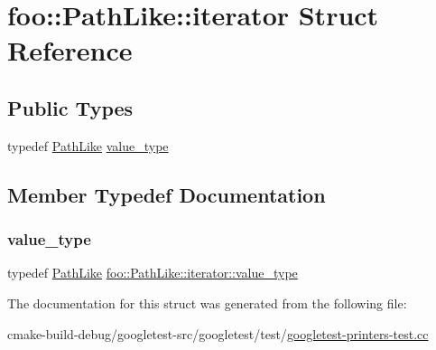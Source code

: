 \hypertarget{structfoo_1_1PathLike_1_1iterator}{}\section{foo\+::Path\+Like\+::iterator Struct Reference}
\label{structfoo_1_1PathLike_1_1iterator}
\subsection*{Public Types}
\begin{DoxyCompactItemize}
\item 
typedef \mbox{\hyperlink{classfoo_1_1PathLike}{Path\+Like}} \mbox{\hyperlink{structfoo_1_1PathLike_1_1iterator_a797c204878a09e04b23cfe6b48ac7016}{value\+\_\+type}}
\end{DoxyCompactItemize}


\subsection{Member Typedef Documentation}
\mbox{\label{structfoo_1_1PathLike_1_1iterator_a797c204878a09e04b23cfe6b48ac7016}} 
\subsubsection{\texorpdfstring{value\_type}{value\_type}}
{\footnotesize\ttfamily typedef \mbox{\hyperlink{classfoo_1_1PathLike}{Path\+Like}} \mbox{\hyperlink{structfoo_1_1PathLike_1_1iterator_a797c204878a09e04b23cfe6b48ac7016}{foo\+::\+Path\+Like\+::iterator\+::value\+\_\+type}}}



The documentation for this struct was generated from the following file\+:\begin{DoxyCompactItemize}
\item 
cmake-\/build-\/debug/googletest-\/src/googletest/test/\mbox{\hyperlink{googletest-printers-test_8cc}{googletest-\/printers-\/test.\+cc}}\end{DoxyCompactItemize}

